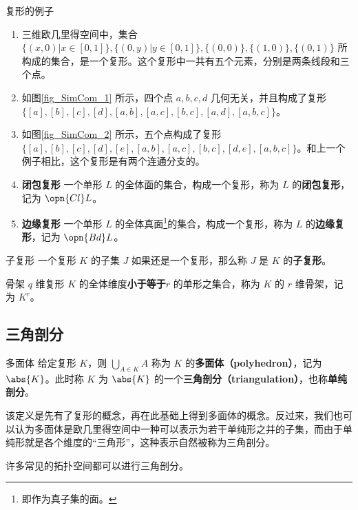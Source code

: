 \begin{example}{复形的例子}
\begin{enumerate}
\item 三维欧几里得空间中，集合 $\{(x, 0)|x\in[0,1]\}, \{(0, y)|y\in[0, 1]\}, \{(0, 0)\}, \{(1, 0)\}, \{(0, 1)\}$ 所构成的集合，是一个复形。这个复形中一共有五个元素，分别是两条线段和三个点。
\item 如图\autoref{fig_SimCom_1} 所示，四个点 $a, b, c, d$ 几何无关，并且构成了复形 $\{[a], [b], [c], [d], [a, b], [a, c], [b, c], [a, d], [a, b, c]\}$。
\item 如图\autoref{fig_SimCom_2} 所示，五个点构成了复形 $\{[a], [b], [c], [d], [e], [a, b], [a, c], [b, c], [d, e], [a, b, c]\}$。和上一个例子相比，这个复形是有两个连通分支的。
\item \textbf{闭包复形} 一个单形 $L$ 的全体面的集合，构成一个复形，称为 $L$ 的\textbf{闭包复形}，记为 $\opn{Cl} L$。
\item \textbf{边缘复形} 一个单形 $L$ 的全体真面\footnote{即作为真子集的面。}的集合，构成一个复形，称为 $L$ 的\textbf{边缘复形}，记为 $\opn{Bd} L$。
\end{enumerate}
\end{example}

\begin{definition}{子复形}
一个复形 $K$ 的子集 $J$ 如果还是一个复形，那么称 $J$ 是 $K$ 的\textbf{子复形}。
\end{definition}

\begin{definition}{骨架}
$q$ 维复形 $K$ 的全体维度\textbf{小于等于}$r$ 的单形之集合，称为 $K$ 的 $r$ 维骨架，记为 $K^r$。
\end{definition}

\subsection{三角剖分}

\begin{definition}{多面体}
给定复形 $K$，则 $\bigcup\limits_{A\in K}A$ 称为 $K$ 的\textbf{多面体（polyhedron）}，记为 $\abs{K}$。此时称 $K$ 为 $\abs{K}$ 的一个\textbf{三角剖分（triangulation）}，也称\textbf{单纯剖分}。
\end{definition}

该定义是先有了复形的概念，再在此基础上得到多面体的概念。反过来，我们也可以认为多面体是欧几里得空间中一种可以表示为若干单纯形之并的子集，而由于单纯形就是各个维度的“三角形”，这种表示自然被称为三角剖分。

许多常见的拓扑空间都可以进行三角剖分。

